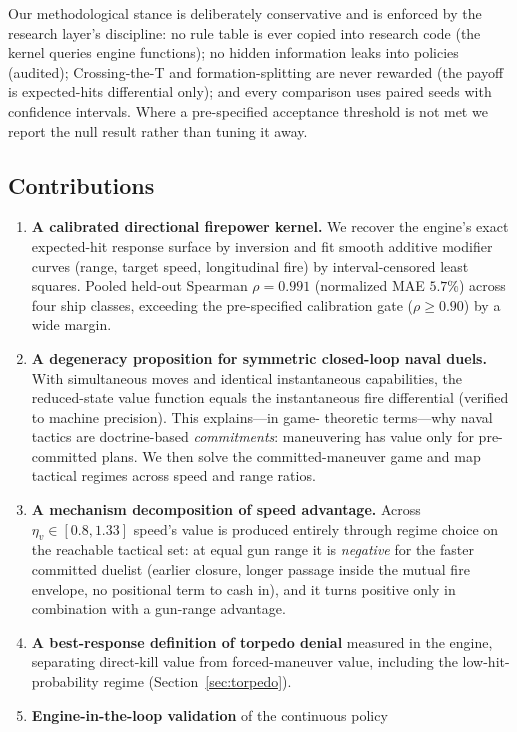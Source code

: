 \documentclass[12pt,a4paper]{article}
\newcommand{\etav}{\eta_v}
\begin{document}
Our methodological stance is deliberately conservative and is enforced by
the research layer's discipline: no rule table is ever copied into research
code (the kernel queries engine functions); no hidden information leaks
into policies (audited); Crossing-the-T and formation-splitting are never
rewarded (the payoff is expected-hits differential only); and every
comparison uses paired seeds with confidence intervals.  Where a
pre-specified acceptance threshold is not met we report the null result
rather than tuning it away.

\subsection{Contributions}
\begin{enumerate}
\item \textbf{A calibrated directional firepower kernel.}  We recover the
engine's exact expected-hit response surface by inversion and fit smooth
additive modifier curves (range, target speed, longitudinal fire) by
interval-censored least squares.  Pooled held-out Spearman $\rho = 0.991$
(normalized MAE $5.7\%$) across four ship classes, exceeding the
pre-specified calibration gate ($\rho\ge0.90$) by a wide margin.
\item \textbf{A degeneracy proposition for symmetric closed-loop naval
duels.}  With simultaneous moves and identical instantaneous capabilities,
the reduced-state value function equals the instantaneous fire
differential (verified to machine precision).  This explains---in game-
theoretic terms---why naval tactics are doctrine-based \emph{commitments}:
maneuvering has value only for pre-committed plans.  We then solve the
committed-maneuver game and map tactical regimes across speed and range
ratios.
\item \textbf{A mechanism decomposition of speed advantage.}  Across
$\etav\in[0.8,1.33]$ speed's value is produced entirely through regime
choice on the reachable tactical set: at equal gun range it is
\emph{negative} for the faster committed duelist (earlier closure, longer
passage inside the mutual fire envelope, no positional term to cash in),
and it turns positive only in combination with a gun-range advantage.
\item \textbf{A best-response definition of torpedo denial} measured in
the engine, separating direct-kill value from forced-maneuver value,
including the low-hit-probability regime (Section~\ref{sec:torpedo}).
\item \textbf{Engine-in-the-loop validation} of the continuous policy

\end{enumerate}
\end{document}
